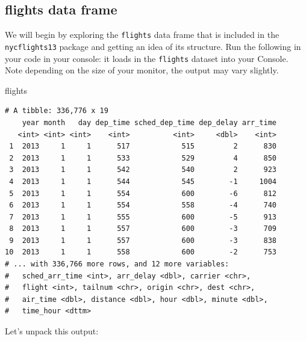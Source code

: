 \documentclass[12pt,]{krantz}
\makeatletter
\newenvironment{Shaded}{\begin{snugshade}}{\end{snugshade}}
\newcommand{\NormalTok}[1]{#1}
\newenvironment{kframe}{%
\medskip{}
\setlength{\fboxsep}{.8em}
 \def\at@end@of@kframe{}%
 \ifinner\ifhmode%
  \def\at@end@of@kframe{\end{minipage}}%
  \begin{minipage}{\columnwidth}%
 \fi\fi%
 \def\FrameCommand##1{\hskip\@totalleftmargin \hskip-\fboxsep
 \colorbox{shadecolor}{##1}\hskip-\fboxsep
     \hskip-\linewidth \hskip-\@totalleftmargin \hskip\columnwidth}%
 \MakeFramed {\advance\hsize-\width
   \@totalleftmargin\z@ \linewidth\hsize
   \@setminipage}}%
 {\par\unskip\endMakeFramed%
 \at@end@of@kframe}
\renewenvironment{Shaded}{\begin{kframe}}{\end{kframe}}
\theoremstyle{definition}
\theoremstyle{definition}
\theoremstyle{definition}
\theoremstyle{remark}
\makeatother
\begin{document}
\subsection{flights data frame}\label{flights-data-frame}

We will begin by exploring the \texttt{flights} data frame that is
included in the \texttt{nycflights13} package and getting an idea of its
structure. Run the following in your code in your console: it loads in
the \texttt{flights} dataset into your Console. Note depending on the
size of your monitor, the output may vary slightly.

\begin{Shaded}
\begin{Highlighting}[]
\NormalTok{flights}
\end{Highlighting}
\end{Shaded}

\begin{verbatim}
# A tibble: 336,776 x 19
    year month   day dep_time sched_dep_time dep_delay arr_time
   <int> <int> <int>    <int>          <int>     <dbl>    <int>
 1  2013     1     1      517            515         2      830
 2  2013     1     1      533            529         4      850
 3  2013     1     1      542            540         2      923
 4  2013     1     1      544            545        -1     1004
 5  2013     1     1      554            600        -6      812
 6  2013     1     1      554            558        -4      740
 7  2013     1     1      555            600        -5      913
 8  2013     1     1      557            600        -3      709
 9  2013     1     1      557            600        -3      838
10  2013     1     1      558            600        -2      753
# ... with 336,766 more rows, and 12 more variables:
#   sched_arr_time <int>, arr_delay <dbl>, carrier <chr>,
#   flight <int>, tailnum <chr>, origin <chr>, dest <chr>,
#   air_time <dbl>, distance <dbl>, hour <dbl>, minute <dbl>,
#   time_hour <dttm>
\end{verbatim}

Let's unpack this output:
\end{document}
